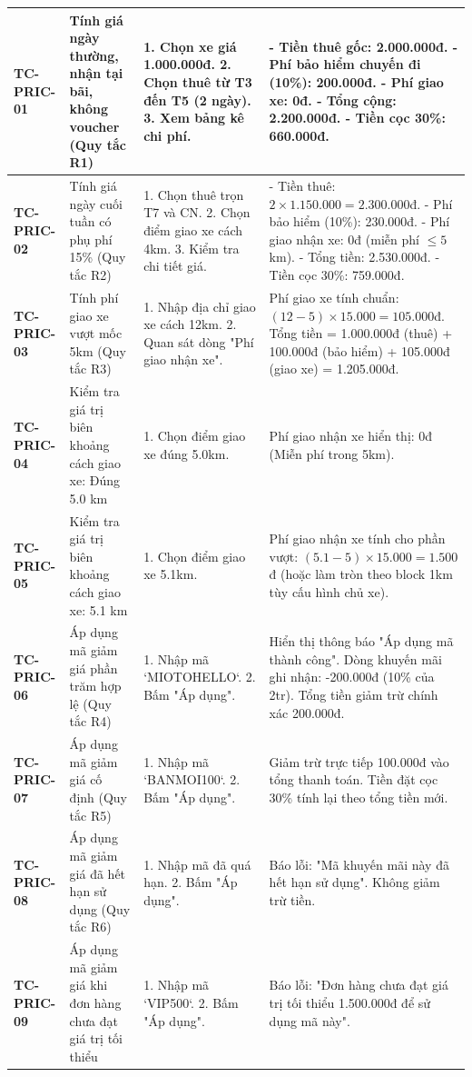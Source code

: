 {\begin{longtable}{p{2.3cm}p{3.8cm}p{4.8cm}p{4.2cm}}
\textbf{TC-PRIC-01} & Tính giá ngày thường, nhận tại bãi, không voucher (Quy tắc R1) & 1. Chọn xe giá 1.000.000đ. 2. Chọn thuê từ T3 đến T5 (2 ngày). 3. Xem bảng kê chi phí. & - Tiền thuê gốc: 2.000.000đ. - Phí bảo hiểm chuyến đi (10\%): 200.000đ. - Phí giao xe: 0đ. - Tổng cộng: 2.200.000đ. - Tiền cọc 30\%: 660.000đ. \\ \midrule
\textbf{TC-PRIC-02} & Tính giá ngày cuối tuần có phụ phí 15\% (Quy tắc R2) & 1. Chọn thuê trọn T7 và CN. 2. Chọn điểm giao xe cách 4km. 3. Kiểm tra chi tiết giá. & - Tiền thuê: $2 \times 1.150.000 = 2.300.000$đ. - Phí bảo hiểm (10\%): 230.000đ. - Phí giao nhận xe: 0đ (miễn phí $\le 5$km). - Tổng tiền: 2.530.000đ. - Tiền cọc 30\%: 759.000đ. \\ \midrule
\textbf{TC-PRIC-03} & Tính phí giao xe vượt mốc 5km (Quy tắc R3) & 1. Nhập địa chỉ giao xe cách 12km. 2. Quan sát dòng "Phí giao nhận xe". & Phí giao xe tính chuẩn: $(12 - 5) \times 15.000 = 105.000$đ. Tổng tiền = 1.000.000đ (thuê) + 100.000đ (bảo hiểm) + 105.000đ (giao xe) = 1.205.000đ. \\ \midrule
\textbf{TC-PRIC-04} & Kiểm tra giá trị biên khoảng cách giao xe: Đúng 5.0 km & 1. Chọn điểm giao xe đúng 5.0km. & Phí giao nhận xe hiển thị: 0đ (Miễn phí trong 5km). \\ \midrule
\textbf{TC-PRIC-05} & Kiểm tra giá trị biên khoảng cách giao xe: 5.1 km & 1. Chọn điểm giao xe 5.1km. & Phí giao nhận xe tính cho phần vượt: $(5.1 - 5) \times 15.000 = 1.500$đ (hoặc làm tròn theo block 1km tùy cấu hình chủ xe). \\ \midrule
\textbf{TC-PRIC-06} & Áp dụng mã giảm giá phần trăm hợp lệ (Quy tắc R4) & 1. Nhập mã `MIOTOHELLO`. 2. Bấm "Áp dụng". & Hiển thị thông báo "Áp dụng mã thành công". Dòng khuyến mãi ghi nhận: -200.000đ (10\% của 2tr). Tổng tiền giảm trừ chính xác 200.000đ. \\ \midrule
\textbf{TC-PRIC-07} & Áp dụng mã giảm giá cố định (Quy tắc R5) & 1. Nhập mã `BANMOI100`. 2. Bấm "Áp dụng". & Giảm trừ trực tiếp 100.000đ vào tổng thanh toán. Tiền đặt cọc 30\% tính lại theo tổng tiền mới. \\ \midrule
\textbf{TC-PRIC-08} & Áp dụng mã giảm giá đã hết hạn sử dụng (Quy tắc R6) & 1. Nhập mã đã quá hạn. 2. Bấm "Áp dụng". & Báo lỗi: "Mã khuyến mãi này đã hết hạn sử dụng". Không giảm trừ tiền. \\ \midrule
\textbf{TC-PRIC-09} & Áp dụng mã giảm giá khi đơn hàng chưa đạt giá trị tối thiểu & 1. Nhập mã `VIP500`. 2. Bấm "Áp dụng". & Báo lỗi: "Đơn hàng chưa đạt giá trị tối thiểu 1.500.000đ để sử dụng mã này". \\ \midrule

\end{longtable}}
